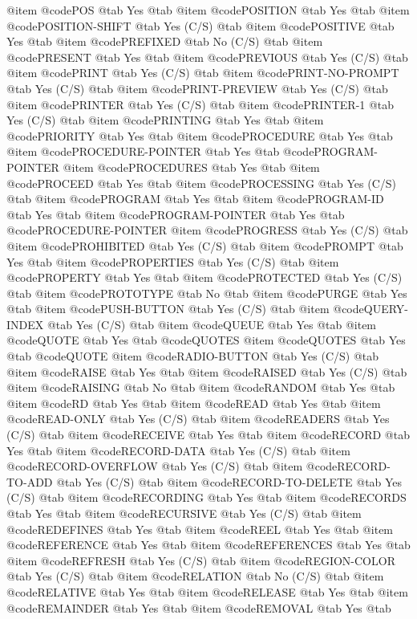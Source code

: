 @item @code{POS} @tab Yes @tab 
@item @code{POSITION} @tab Yes @tab 
@item @code{POSITION-SHIFT} @tab Yes	(C/S) @tab 
@item @code{POSITIVE} @tab Yes @tab 
@item @code{PREFIXED} @tab No	(C/S) @tab 
@item @code{PRESENT} @tab Yes @tab 
@item @code{PREVIOUS} @tab Yes	(C/S) @tab 
@item @code{PRINT} @tab Yes	(C/S) @tab 
@item @code{PRINT-NO-PROMPT} @tab Yes	(C/S) @tab 
@item @code{PRINT-PREVIEW} @tab Yes	(C/S) @tab 
@item @code{PRINTER} @tab Yes	(C/S) @tab 
@item @code{PRINTER-1} @tab Yes	(C/S) @tab 
@item @code{PRINTING} @tab Yes @tab 
@item @code{PRIORITY} @tab Yes @tab 
@item @code{PROCEDURE} @tab Yes @tab 
@item @code{PROCEDURE-POINTER} @tab Yes @tab @code{PROGRAM-POINTER}
@item @code{PROCEDURES} @tab Yes @tab 
@item @code{PROCEED} @tab Yes @tab 
@item @code{PROCESSING} @tab Yes	(C/S) @tab 
@item @code{PROGRAM} @tab Yes @tab 
@item @code{PROGRAM-ID} @tab Yes @tab 
@item @code{PROGRAM-POINTER} @tab Yes @tab @code{PROCEDURE-POINTER}
@item @code{PROGRESS} @tab Yes	(C/S) @tab 
@item @code{PROHIBITED} @tab Yes	(C/S) @tab 
@item @code{PROMPT} @tab Yes @tab 
@item @code{PROPERTIES} @tab Yes	(C/S) @tab 
@item @code{PROPERTY} @tab Yes @tab 
@item @code{PROTECTED} @tab Yes	(C/S) @tab 
@item @code{PROTOTYPE} @tab No @tab 
@item @code{PURGE} @tab Yes @tab 
@item @code{PUSH-BUTTON} @tab Yes	(C/S) @tab 
@item @code{QUERY-INDEX} @tab Yes	(C/S) @tab 
@item @code{QUEUE} @tab Yes @tab 
@item @code{QUOTE} @tab Yes @tab @code{QUOTES}
@item @code{QUOTES} @tab Yes @tab @code{QUOTE}
@item @code{RADIO-BUTTON} @tab Yes	(C/S) @tab 
@item @code{RAISE} @tab Yes @tab 
@item @code{RAISED} @tab Yes	(C/S) @tab 
@item @code{RAISING} @tab No @tab 
@item @code{RANDOM} @tab Yes @tab 
@item @code{RD} @tab Yes @tab 
@item @code{READ} @tab Yes @tab 
@item @code{READ-ONLY} @tab Yes	(C/S) @tab 
@item @code{READERS} @tab Yes	(C/S) @tab 
@item @code{RECEIVE} @tab Yes @tab 
@item @code{RECORD} @tab Yes @tab 
@item @code{RECORD-DATA} @tab Yes	(C/S) @tab 
@item @code{RECORD-OVERFLOW} @tab Yes	(C/S) @tab 
@item @code{RECORD-TO-ADD} @tab Yes	(C/S) @tab 
@item @code{RECORD-TO-DELETE} @tab Yes	(C/S) @tab 
@item @code{RECORDING} @tab Yes @tab 
@item @code{RECORDS} @tab Yes @tab 
@item @code{RECURSIVE} @tab Yes	(C/S) @tab 
@item @code{REDEFINES} @tab Yes @tab 
@item @code{REEL} @tab Yes @tab 
@item @code{REFERENCE} @tab Yes @tab 
@item @code{REFERENCES} @tab Yes @tab 
@item @code{REFRESH} @tab Yes	(C/S) @tab 
@item @code{REGION-COLOR} @tab Yes	(C/S) @tab 
@item @code{RELATION} @tab No	(C/S) @tab 
@item @code{RELATIVE} @tab Yes @tab 
@item @code{RELEASE} @tab Yes @tab 
@item @code{REMAINDER} @tab Yes @tab 
@item @code{REMOVAL} @tab Yes @tab 
